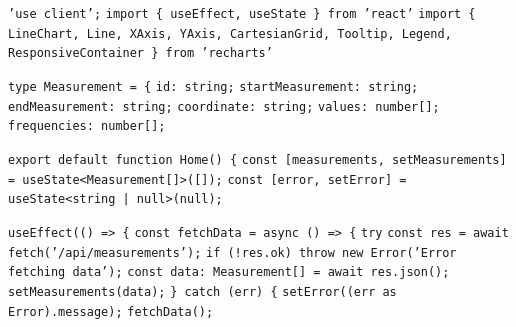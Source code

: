 \begin{algorithmic}[1]
	\STATE \texttt{'use client';}
	\STATE \texttt{import \{ useEffect, useState \} from 'react'}
	\STATE \texttt{import \{ LineChart, Line, XAxis, YAxis, CartesianGrid, Tooltip, Legend, ResponsiveContainer \} from 'recharts'}

	\STATE \texttt{type Measurement = \{}
	\STATE \hspace{0.5cm} \texttt{id: string;}
	\STATE \hspace{0.5cm} \texttt{startMeasurement: string;}
	\STATE \hspace{0.5cm} \texttt{endMeasurement: string;}
	\STATE \hspace{0.5cm} \texttt{coordinate: string;}
	\STATE \hspace{0.5cm} \texttt{values: number[];}
	\STATE \hspace{0.5cm} \texttt{frequencies: number[];}

	\STATE \texttt{export default function Home() \{}
	\STATE \hspace{0.5cm} \texttt{const [measurements, setMeasurements] = useState<Measurement[]>([]);}
	\STATE \hspace{0.5cm} \texttt{const [error, setError] = useState<string | null>(null);}
	
	\STATE
	\STATE \hspace{0.5cm} \texttt{useEffect(() => \{}
	\STATE \hspace{1.0cm} \texttt{const fetchData = async () => \{}
	\STATE \hspace{1.5cm} \texttt{try}
	\STATE \hspace{2.0cm} \texttt{const res = await fetch('/api/measurements');}
	\STATE \hspace{2.0cm} \texttt{if (!res.ok) throw new Error('Error fetching data');}
	\STATE \hspace{2.0cm} \texttt{const data: Measurement[] = await res.json();}
	\STATE \hspace{2.0cm} \texttt{setMeasurements(data);}
	\STATE \hspace{1.5cm} \texttt{\} catch (err) \{}
	\STATE \hspace{2.0cm} \texttt{setError((err as Error).message);}
	\STATE \hspace{1.0cm} \texttt{fetchData();}


\end{algorithmic}
